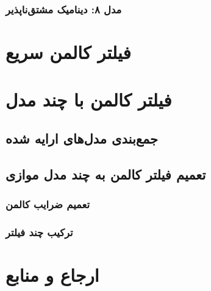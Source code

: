 \documentclass{scribe-cgenomics}
\begin{document}
\subsubsection{مدل ۸: دینامیک مشتق‌ناپذیر}


\section{فیلتر کالمن سریع}


\section{فیلتر کالمن با چند مدل}
\subsection{جمع‌بندی مدل‌های ارایه شده}
\subsection{تعمیم فیلتر کالمن به چند مدل موازی}
\subsubsection{تعمیم ضرایب کالمن}
\subsubsection{ترکیب چند فیلتر}

\section{ارجاع و منابع}




\end{document}
